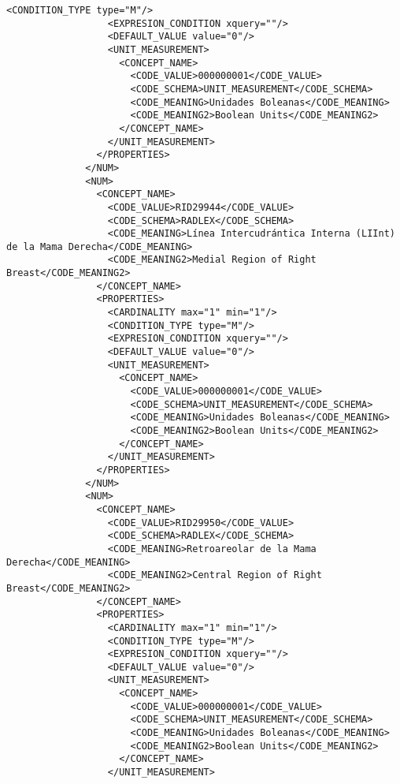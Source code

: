 \begin{lstlisting}[label=dicom-report,caption=Informe estructurado de una exploración de mama]
                  <CONDITION_TYPE type="M"/>
                  <EXPRESION_CONDITION xquery=""/>
                  <DEFAULT_VALUE value="0"/>
                  <UNIT_MEASUREMENT>
                    <CONCEPT_NAME>
                      <CODE_VALUE>000000001</CODE_VALUE>
                      <CODE_SCHEMA>UNIT_MEASUREMENT</CODE_SCHEMA>
                      <CODE_MEANING>Unidades Boleanas</CODE_MEANING>
                      <CODE_MEANING2>Boolean Units</CODE_MEANING2>
                    </CONCEPT_NAME>
                  </UNIT_MEASUREMENT>
                </PROPERTIES>
              </NUM>
              <NUM>
                <CONCEPT_NAME>
                  <CODE_VALUE>RID29944</CODE_VALUE>
                  <CODE_SCHEMA>RADLEX</CODE_SCHEMA>
                  <CODE_MEANING>Línea Intercudrántica Interna (LIInt) de la Mama Derecha</CODE_MEANING>
                  <CODE_MEANING2>Medial Region of Right Breast</CODE_MEANING2>
                </CONCEPT_NAME>
                <PROPERTIES>
                  <CARDINALITY max="1" min="1"/>
                  <CONDITION_TYPE type="M"/>
                  <EXPRESION_CONDITION xquery=""/>
                  <DEFAULT_VALUE value="0"/>
                  <UNIT_MEASUREMENT>
                    <CONCEPT_NAME>
                      <CODE_VALUE>000000001</CODE_VALUE>
                      <CODE_SCHEMA>UNIT_MEASUREMENT</CODE_SCHEMA>
                      <CODE_MEANING>Unidades Boleanas</CODE_MEANING>
                      <CODE_MEANING2>Boolean Units</CODE_MEANING2>
                    </CONCEPT_NAME>
                  </UNIT_MEASUREMENT>
                </PROPERTIES>
              </NUM>
              <NUM>
                <CONCEPT_NAME>
                  <CODE_VALUE>RID29950</CODE_VALUE>
                  <CODE_SCHEMA>RADLEX</CODE_SCHEMA>
                  <CODE_MEANING>Retroareolar de la Mama Derecha</CODE_MEANING>
                  <CODE_MEANING2>Central Region of Right Breast</CODE_MEANING2>
                </CONCEPT_NAME>
                <PROPERTIES>
                  <CARDINALITY max="1" min="1"/>
                  <CONDITION_TYPE type="M"/>
                  <EXPRESION_CONDITION xquery=""/>
                  <DEFAULT_VALUE value="0"/>
                  <UNIT_MEASUREMENT>
                    <CONCEPT_NAME>
                      <CODE_VALUE>000000001</CODE_VALUE>
                      <CODE_SCHEMA>UNIT_MEASUREMENT</CODE_SCHEMA>
                      <CODE_MEANING>Unidades Boleanas</CODE_MEANING>
                      <CODE_MEANING2>Boolean Units</CODE_MEANING2>
                    </CONCEPT_NAME>
                  </UNIT_MEASUREMENT>

\end{lstlisting}
